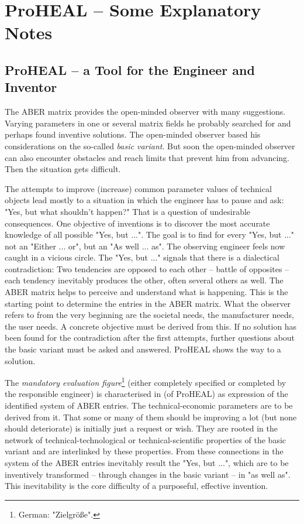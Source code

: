 \documentclass[11pt,a4paper]{article}
\begin{document}
\section{ProHEAL -- Some Explanatory Notes}

\subsection{ProHEAL -- a Tool for the Engineer and Inventor}

The ABER matrix provides the open-minded observer with many suggestions.
Varying parameters in one or several matrix fields he probably searched for
and perhaps found inventive solutions. The open-minded observer based his
considerations on the so-called \emph{basic variant}. But soon the open-minded
observer can also encounter obstacles and reach limits that prevent him from
advancing. Then the situation gets difficult.

The attempts to improve (increase) common parameter values of technical
objects lead mostly to a situation in which the engineer has to pause and ask:
"Yes, but what shouldn't happen?" That is a question of undesirable
consequences. One objective of inventions is to discover the most accurate
knowledge of all possible "Yes, but ...".  The goal is to find for every "Yes,
but ..."  not an "Either ... or", but an "As well ... as". The observing
engineer feels now caught in a vicious circle. The "Yes, but ..."  signals
that there is a dialectical contradiction: Two tendencies are opposed to each
other -- battle of opposites -- each tendency inevitably produces the other,
often several others as well. The ABER matrix helps to perceive and understand
what is happening. This is the starting point to determine the entries in the
ABER matrix. What the observer refers to from the very beginning are the
societal needs, the manufacturer needs, the user needs. A concrete objective
must be derived from this. If no solution has been found for the contradiction
after the first attempts, further questions about the basic variant must be
asked and answered. ProHEAL shows the way to a solution.

The \emph{mandatory evaluation figure}\footnote{German: "Zielgröße".} (either
completely specified or completed by the responsible engineer) is
characterised in \cite[(1.3)]{RM-21} (of ProHEAL) as expression of the
identified system of ABER entries. The technical-economic parameters are to be
derived from it. That some or many of them should be improving a lot (but none
should deteriorate) is initially just a request or wish. They are rooted in
the network of technical-technological or technical-scientific properties of
the basic variant and are interlinked by these properties. From these
connections in the system of the ABER entries inevitably result the "Yes, but
...", which are to be inventively transformed -- through changes in the basic
variant -- in "as well as". This inevitability is the core difficulty of a
purposeful, effective invention.
\end{document}
